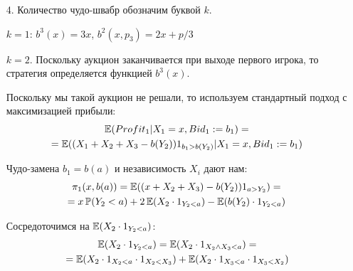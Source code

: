 \begin{enumerate}

\item[4.] Количество чудо-швабр обозначим буквой $k$.

$ k=1 $: $ b^{3}(x)=3x $, $ b^{2}(x,p_{3})=2x+p/3$

$ k=2 $. Поскольку аукцион заканчивается при выходе первого игрока, то стратегия определяется функцией $ b^{3}(x)$.

Поскольку мы такой аукцион не решали, то используем стандартный подход с максимизацией прибыли:
\begin{multline}
\operatorname{\mathbb{E}}(Profit_{1}|X_{1}=x,Bid_{1}:=b_{1})=\\
=\operatorname{\mathbb{E}}((X_{1}+X_{2}+X_{3}-b(Y_{2}))1_{b_{1}>b(Y_{2})}|X_{1}=x,Bid_{1}:=b_{1})
\end{multline}

Чудо-замена $b_{1}=b(a)$ и независимость $ X_{i} $ дают нам:
\begin{multline}
\pi_{1}(x,b(a))=\operatorname{\mathbb{E}}((x+X_{2}+X_{3})-b(Y_{2}))1_{a>Y_{2}})=\\
=x\operatorname{\mathbb{P}}(Y_{2}<a)+2\operatorname{\mathbb{E}}(X_{2}\cdot 1_{Y_{2}<a})-\operatorname{\mathbb{E}}(b(Y_{2})\cdot 1_{Y_{2}<a})
\end{multline}

Сосредоточимся на $\operatorname{\mathbb{E}}(X_{2}\cdot 1_{Y_{2}<a}) $:
\begin{multline}
\operatorname{\mathbb{E}}(X_{2}\cdot 1_{Y_{2}<a})=\operatorname{\mathbb{E}}(X_{2}\cdot 1_{X_{2}\wedge X_{3}<a})=\\
=\operatorname{\mathbb{E}}(X_{2}\cdot 1_{X_{2}<a}\cdot 1_{X_{2}<X_{3}})+\operatorname{\mathbb{E}}(X_{2}\cdot 1_{X_{3}<a}\cdot 1_{X_{3}<X_{2}})
\end{multline}


\end{enumerate}
